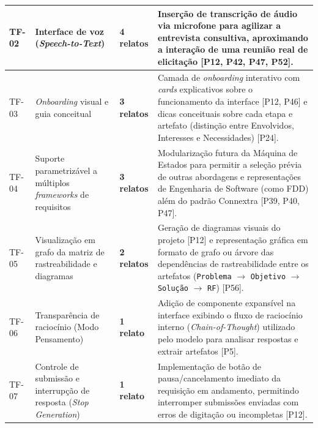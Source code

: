 \begin{apendicesenv}
{\begin{xltabular}{\textwidth}{|l|>{\raggedright\arraybackslash}p{3.4cm}|>{\raggedright\arraybackslash}p{2.7cm}|>{\raggedright\arraybackslash}X|}
    \midrule
    TF-02 & Interface de voz (\textit{Speech-to-Text}) & \textbf{4 relatos} \newline [P12, P42, P47, P52] & Inserção de transcrição de áudio via microfone para agilizar a entrevista consultiva, aproximando a interação de uma reunião real de elicitação [P12, P42, P47, P52]. \\
    \midrule
    TF-03 & \textit{Onboarding} visual e guia conceitual & \textbf{3 relatos} \newline [P12, P24, P46] & Camada de \textit{onboarding} interativo com \textit{cards} explicativos sobre o funcionamento da interface [P12, P46] e dicas conceituais sobre cada etapa e artefato (distinção entre Envolvidos, Interesses e Necessidades) [P24]. \\
    \midrule
    TF-04 & Suporte parametrizável a múltiplos \textit{frameworks} de requisitos & \textbf{3 relatos} \newline [P39, P40, P47] & Modularização futura da Máquina de Estados para permitir a seleção prévia de outras abordagens e representações de Engenharia de Software (como FDD) além do padrão Connextra [P39, P40, P47]. \\
    \midrule
    TF-05 & Visualização em grafo da matriz de rastreabilidade e diagramas & \textbf{2 relatos} \newline [P12, P56] & Geração de diagramas visuais do projeto [P12] e representação gráfica em formato de grafo ou árvore das dependências de rastreabilidade entre os artefatos (\texttt{Problema} $\rightarrow$ \texttt{Objetivo} $\rightarrow$ \texttt{Solução} $\rightarrow$ \texttt{RF}) [P56]. \\
    \midrule
    TF-06 & Transparência de raciocínio (Modo Pensamento) & \textbf{1 relato} \newline [P5] & Adição de componente expansível na interface exibindo o fluxo de raciocínio interno (\textit{Chain-of-Thought}) utilizado pelo modelo para analisar respostas e extrair artefatos [P5]. \\
    \midrule
    TF-07 & Controle de submissão e interrupção de resposta (\textit{Stop Generation}) & \textbf{1 relato} \newline [P12] & Implementação de botão de pausa/cancelamento imediato da requisição em andamento, permitindo interromper submissões enviadas com erros de digitação ou incompletas [P12]. \\
\end{xltabular}
}

\end{apendicesenv}
